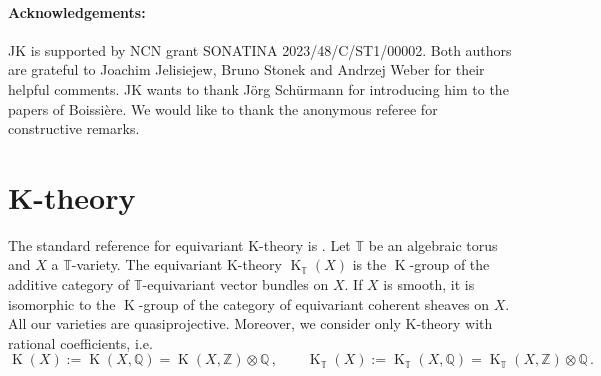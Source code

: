 \documentclass[12pt,a4paper]{amsart}
\theoremstyle{plain}
\theoremstyle{definition}
\theoremstyle{remark}
\newcommand{\ZZ}{\mathbb{Z}}
\newcommand{\QQ}{\mathbb{Q}}
\newcommand{\TT}{\mathbb{T}}
\DeclareMathOperator{\KTh}{K}
\begin{document}
\paragraph{\bf Acknowledgements:} JK is supported by NCN grant SONATINA 2023/48/C/ST1/00002.
Both authors are grateful to Joachim Jelisiejew, Bruno Stonek and Andrzej Weber for their helpful comments.
JK wants to thank J\"org Sch\"urmann for introducing him to the papers of Boissière.
We would like to thank the anonymous referee for constructive remarks.



\section{K-theory} \label{s:K}
 The standard reference for equivariant K-theory is \cite{CG}. Let $\TT$ be an algebraic torus and $X$ a $\TT$-variety. The equivariant K-theory $\KTh_\TT(X)$ is the $\KTh$-group of the additive category of $\TT$-equivariant vector bundles on $X$. If $X$ is smooth, it is isomorphic to the $\KTh$-group of the category of equivariant coherent sheaves on $X$. All our varieties are quasiprojective. Moreover, we consider only K-theory with rational coefficients, i.e.
	$$\KTh(X):=\KTh(X,\QQ)=\KTh(X,\ZZ)\otimes\QQ\,,\qquad \KTh_\TT(X):=\KTh_\TT(X,\QQ)=\KTh_\TT(X,\ZZ)\otimes\QQ\,.$$
\end{document}
